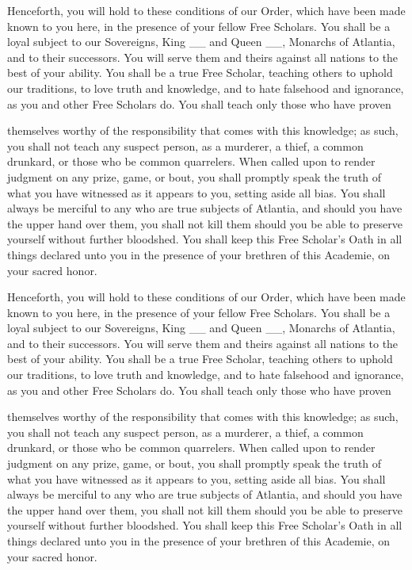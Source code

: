 \documentclass[avery5371,grid]{flashcards}
\begin{document}
\begin{flashcard}{
    \begin{minipage}{\cardinnerwidth}
        \fontsize{10}{10}
        \normalfont
        Henceforth, you will hold to these conditions of our Order, which have been made known to you here, in the presence of your fellow Free Scholars.
        You shall be a loyal subject to our Sovereigns, King \_\_ and Queen \_\_, Monarchs of Atlantia, and to their successors. You will serve them and theirs against all nations to the best of your ability.
        You shall be a true Free Scholar, teaching others to uphold our traditions, to love truth and knowledge, and to hate falsehood and ignorance, as you and other Free Scholars do.
        You shall teach only those who have proven
    \end{minipage}
}
    themselves worthy of the responsibility that comes with
    this knowledge;
    as such, you shall not teach any suspect person, as a murderer, a thief, a common drunkard, or those who be common quarrelers.
    When called upon to render judgment on any prize, game, or bout, you shall promptly speak the truth of what you have witnessed as it appears to you, setting aside all bias.
    You shall always be merciful to any who are true subjects of Atlantia, and should you have the upper hand over them, you shall not kill them should you be able to preserve yourself without further bloodshed.
    You shall keep this Free Scholar's Oath in all things declared unto you in the presence of your brethren of this Academie, on your sacred honor.
\end{flashcard}
\begin{flashcard}{
    \begin{minipage}{\cardinnerwidth}
        \fontsize{10}{10}
        \normalfont
        Henceforth, you will hold to these conditions of our Order, which have been made known to you here, in the presence of your fellow Free Scholars.
        You shall be a loyal subject to our Sovereigns, King \_\_ and Queen \_\_, Monarchs of Atlantia, and to their successors. You will serve them and theirs against all nations to the best of your ability.
        You shall be a true Free Scholar, teaching others to uphold our traditions, to love truth and knowledge, and to hate falsehood and ignorance, as you and other Free Scholars do.
        You shall teach only those who have proven
    \end{minipage}
}
    themselves worthy of the responsibility that comes with
    this knowledge;
    as such, you shall not teach any suspect person, as a murderer, a thief, a common drunkard, or those who be common quarrelers.
    When called upon to render judgment on any prize, game, or bout, you shall promptly speak the truth of what you have witnessed as it appears to you, setting aside all bias.
    You shall always be merciful to any who are true subjects of Atlantia, and should you have the upper hand over them, you shall not kill them should you be able to preserve yourself without further bloodshed.
    You shall keep this Free Scholar's Oath in all things declared unto you in the presence of your brethren of this Academie, on your sacred honor.
\end{flashcard}
\end{document}
